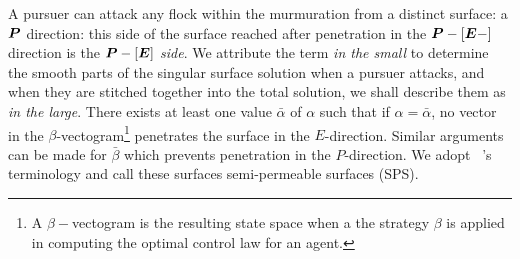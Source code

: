 A pursuer can attack any flock within the murmuration from a distinct surface: a $\bm{P}$ direction: this side of the surface reached after penetration in the $\bm{P}-[\bm{E}-]$ direction is the $\bm{P}-[\bm{E}]$ \textit{side}\cite{Isaacs1965}. We  attribute the term \textit{in the small} to determine the smooth parts of the singular surface solution when a pursuer attacks, and when they are stitched together into the total solution, we shall describe them as \textit{in the large}. There exists at least one value $\bar{\alpha}$ of $\alpha$ such that if $\alpha = \bar{\alpha}$, no vector in the $\beta$-vectogram\footnote{A $\beta-$vectogram is the resulting state space when a the strategy $\beta$ is applied in computing the optimal control law for an agent.} penetrates the surface in the $E$-direction. Similar arguments can be made for $\bar{\beta}$ which prevents penetration in the $P$-direction. We adopt ~\cite{Isaacs1965}'s terminology and call these surfaces semi-permeable surfaces (SPS).

